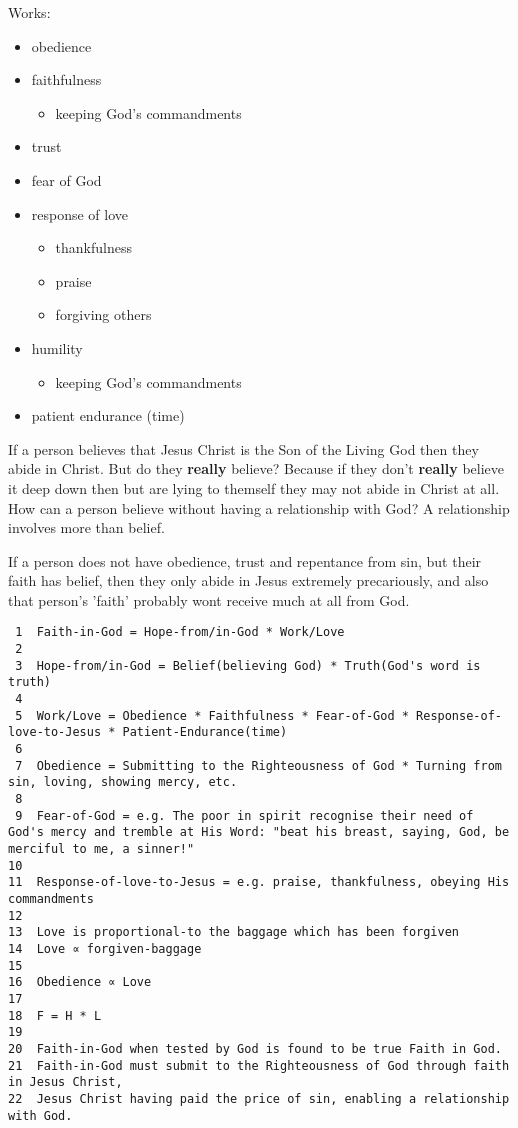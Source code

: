 \documentclass[11pt]{article}
\begin{document}
Works:
\begin{itemize}
\item obedience
\item faithfulness
\begin{itemize}
\item keeping God's commandments
\end{itemize}
\item trust
\item fear of God
\item response of love
\begin{itemize}
\item thankfulness
\item praise
\item forgiving others
\end{itemize}
\item humility
\begin{itemize}
\item keeping God's commandments
\end{itemize}
\item patient endurance (time)
\end{itemize}

If a person believes that Jesus Christ is the Son of the Living God then they abide in Christ.
But do they \textbf{really} believe? Because if they don't \textbf{really} believe it deep down then but are lying to themself they may not abide in Christ at all.
How can a person believe without having a relationship with God? A relationship involves more than belief.

If a person does not have obedience, trust and
repentance from sin, but their faith has belief, then they only
abide in Jesus extremely precariously, and also that person's 'faith' probably wont receive much at all from God.

\begin{verbatim}
 1  Faith-in-God = Hope-from/in-God * Work/Love
 2  
 3  Hope-from/in-God = Belief(believing God) * Truth(God's word is truth)
 4  
 5  Work/Love = Obedience * Faithfulness * Fear-of-God * Response-of-love-to-Jesus * Patient-Endurance(time)
 6  
 7  Obedience = Submitting to the Righteousness of God * Turning from sin, loving, showing mercy, etc.
 8  
 9  Fear-of-God = e.g. The poor in spirit recognise their need of God's mercy and tremble at His Word: "beat his breast, saying, God, be merciful to me, a sinner!"
10  
11  Response-of-love-to-Jesus = e.g. praise, thankfulness, obeying His commandments
12  
13  Love is proportional-to the baggage which has been forgiven
14  Love ∝ forgiven-baggage
15  
16  Obedience ∝ Love
17  
18  F = H * L
19  
20  Faith-in-God when tested by God is found to be true Faith in God.
21  Faith-in-God must submit to the Righteousness of God through faith in Jesus Christ,
22  Jesus Christ having paid the price of sin, enabling a relationship with God.
\end{verbatim}
\end{document}
